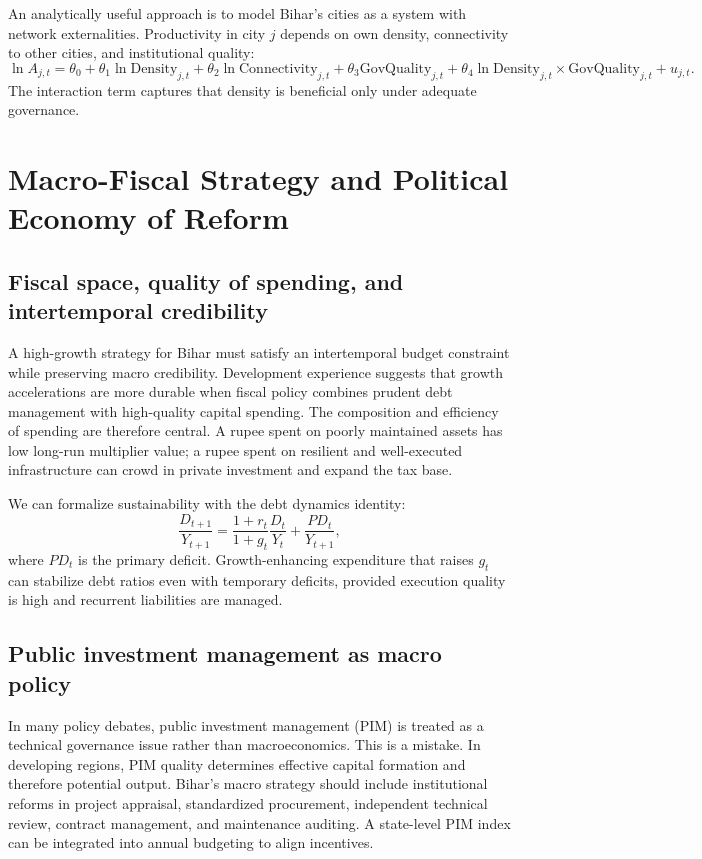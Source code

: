 \documentclass[preprint,12pt]{elsarticle}
\begin{document}
An analytically useful approach is to model Bihar's cities as a system with network externalities. Productivity in city $j$ depends on own density, connectivity to other cities, and institutional quality:
\begin{equation}
\ln A_{j,t}=\theta_0+\theta_1\ln \text{Density}_{j,t}+\theta_2\ln \text{Connectivity}_{j,t}+\theta_3\text{GovQuality}_{j,t}+\theta_4\ln \text{Density}_{j,t}\times \text{GovQuality}_{j,t}+u_{j,t}.
\end{equation}
The interaction term captures that density is beneficial only under adequate governance.

\section{Macro-Fiscal Strategy and Political Economy of Reform}
\subsection{Fiscal space, quality of spending, and intertemporal credibility}
A high-growth strategy for Bihar must satisfy an intertemporal budget constraint while preserving macro credibility. Development experience suggests that growth accelerations are more durable when fiscal policy combines prudent debt management with high-quality capital spending. The composition and efficiency of spending are therefore central. A rupee spent on poorly maintained assets has low long-run multiplier value; a rupee spent on resilient and well-executed infrastructure can crowd in private investment and expand the tax base.

We can formalize sustainability with the debt dynamics identity:
\begin{equation}
\frac{D_{t+1}}{Y_{t+1}} = \frac{1+r_t}{1+g_t}\frac{D_t}{Y_t} + \frac{PD_t}{Y_{t+1}},
\end{equation}
where $PD_t$ is the primary deficit. Growth-enhancing expenditure that raises $g_t$ can stabilize debt ratios even with temporary deficits, provided execution quality is high and recurrent liabilities are managed.

\subsection{Public investment management as macro policy}
In many policy debates, public investment management (PIM) is treated as a technical governance issue rather than macroeconomics. This is a mistake. In developing regions, PIM quality determines effective capital formation and therefore potential output. Bihar's macro strategy should include institutional reforms in project appraisal, standardized procurement, independent technical review, contract management, and maintenance auditing. A state-level PIM index can be integrated into annual budgeting to align incentives.
\end{document}
